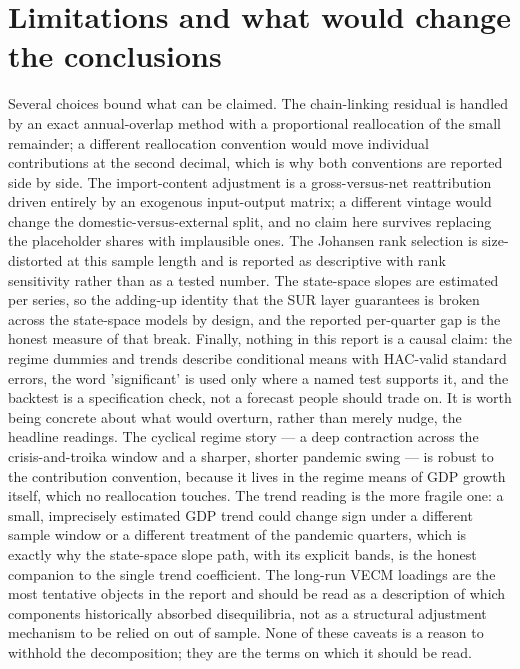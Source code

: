 \documentclass[11pt,a4paper]{article}
\begin{document}
\section{Limitations and what would change the conclusions}
Several choices bound what can be claimed. The chain-linking residual is handled by an exact annual-overlap method with a proportional reallocation of the small remainder; a different reallocation convention would move individual contributions at the second decimal, which is why both conventions are reported side by side. The import-content adjustment is a gross-versus-net reattribution driven entirely by an exogenous input-output matrix; a different vintage would change the domestic-versus-external split, and no claim here survives replacing the placeholder shares with implausible ones. The Johansen rank selection is size-distorted at this sample length and is reported as descriptive with rank sensitivity rather than as a tested number. The state-space slopes are estimated per series, so the adding-up identity that the SUR layer guarantees is broken across the state-space models by design, and the reported per-quarter gap is the honest measure of that break. Finally, nothing in this report is a causal claim: the regime dummies and trends describe conditional means with HAC-valid standard errors, the word 'significant' is used only where a named test supports it, and the backtest is a specification check, not a forecast people should trade on.
It is worth being concrete about what would overturn, rather than merely nudge, the headline readings. The cyclical regime story --- a deep contraction across the crisis-and-troika window and a sharper, shorter pandemic swing --- is robust to the contribution convention, because it lives in the regime means of GDP growth itself, which no reallocation touches. The trend reading is the more fragile one: a small, imprecisely estimated GDP trend could change sign under a different sample window or a different treatment of the pandemic quarters, which is exactly why the state-space slope path, with its explicit bands, is the honest companion to the single trend coefficient. The long-run VECM loadings are the most tentative objects in the report and should be read as a description of which components historically absorbed disequilibria, not as a structural adjustment mechanism to be relied on out of sample. None of these caveats is a reason to withhold the decomposition; they are the terms on which it should be read.
\end{document}
